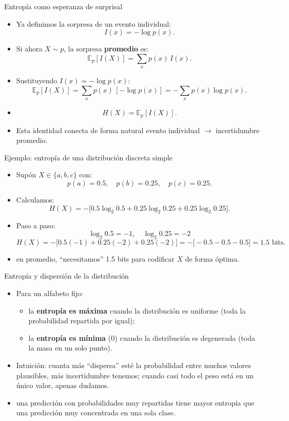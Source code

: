 \begin{frame}{Entropía como esperanza de surprisal}
\begin{itemize}
  \item Ya definimos la sorpresa de un evento individual:
  \[
    I(x)=-\log p(x).
  \]
  \item Si ahora \(X\sim p\), la sorpresa \textbf{promedio} es:
  \[
    \mathbb{E}_{p}[I(X)] = \sum_x p(x)\,I(x).
  \]
  \item Sustituyendo \(I(x)=-\log p(x)\):
  \[
    \mathbb{E}_{p}[I(X)] = \sum_x p(x)\,[-\log p(x)] = -\sum_x p(x)\log p(x).
  \]
  \item {}
  \[
    H(X)=\mathbb{E}_{p}[I(X)].
  \]
  \item Esta identidad conecta de forma natural evento individual \(\rightarrow\) incertidumbre promedio.
\end{itemize}
\end{frame}

\begin{frame}{Ejemplo: entropía de una distribución discreta simple}
\begin{itemize}
  \item Supón \(X\in\{a,b,c\}\) con:
  \[
    p(a)=0.5,\quad p(b)=0.25,\quad p(c)=0.25.
  \]
  \item Calculamos:
  \[
    H(X) = -\big[0.5\log_2 0.5 + 0.25\log_2 0.25 + 0.25\log_2 0.25\big].
  \]
  \item Paso a paso:
  \[
    \log_2 0.5 = -1,\quad \log_2 0.25=-2
  \]
  \[
    H(X) = -\big[0.5(-1) + 0.25(-2) + 0.25(-2)\big]
    = -\big[-0.5 -0.5 -0.5\big] = 1.5 \text{ bits.}
  \]
  \item {} en promedio, “necesitamos” 1.5 bits para codificar \(X\) de forma óptima.
\end{itemize}
\end{frame}

\begin{frame}{Entropía y dispersión de la distribución}
\begin{itemize}
  \item Para un alfabeto fijo:
  \begin{itemize}
    \item la \textbf{entropía es máxima} cuando la distribución es uniforme (toda la probabilidad repartida por igual);
    \item la \textbf{entropía es mínima} (0) cuando la distribución es degenerada (toda la masa en un solo punto).
  \end{itemize}
  \item Intuición: cuanta más “dispersa” esté la probabilidad entre muchos valores plausibles, más incertidumbre tenemos; cuando casi todo el peso está en un único valor, apenas dudamos.
  \item {} una predicción con probabilidades muy repartidas tiene mayor entropía que una predicción muy concentrada en una sola clase.
\end{itemize}
\end{frame}

